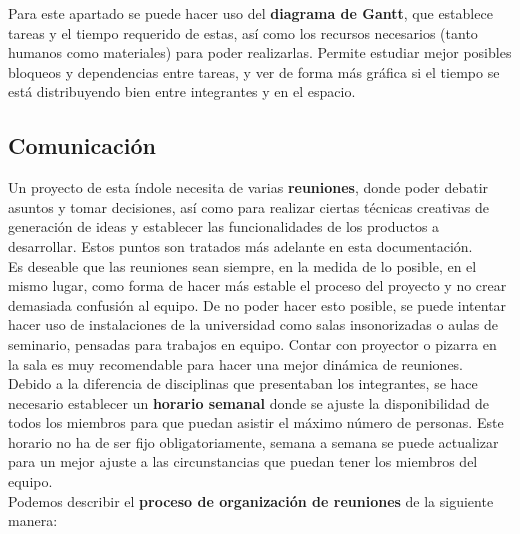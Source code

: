 Para este apartado se puede hacer uso del \textbf{diagrama de Gantt}, que establece tareas y el tiempo requerido de estas, así como los recursos necesarios (tanto humanos como materiales) para poder realizarlas. Permite estudiar mejor posibles bloqueos y dependencias entre tareas, y ver de forma más gráfica si el tiempo se está distribuyendo bien entre integrantes y en el espacio.

\subsection{Comunicación}
Un proyecto de esta índole necesita de varias \textbf{reuniones}, donde poder debatir asuntos y tomar decisiones, así como para realizar ciertas técnicas creativas de generación de ideas y establecer las funcionalidades de los productos a desarrollar. Estos puntos son tratados más adelante en esta documentación.\\

Es deseable que las reuniones sean siempre, en la medida de lo posible, en el mismo lugar, como forma de hacer más estable el proceso del proyecto y no crear demasiada confusión al equipo. De no poder hacer esto posible, se puede intentar hacer uso de instalaciones de la universidad como salas insonorizadas o aulas de seminario, pensadas para trabajos en equipo. Contar con proyector o pizarra en la sala es muy recomendable para hacer una mejor dinámica de reuniones.\\

Debido a la diferencia de disciplinas que presentaban los integrantes, se hace necesario establecer un \textbf{horario semanal} donde se ajuste la disponibilidad de todos los miembros para que puedan asistir el máximo número de personas. Este horario no ha de ser fijo obligatoriamente, semana a semana se puede actualizar para un mejor ajuste a las circunstancias que puedan tener los miembros del equipo.\\

Podemos describir el \textbf{proceso de organización de reuniones} de la siguiente manera:

